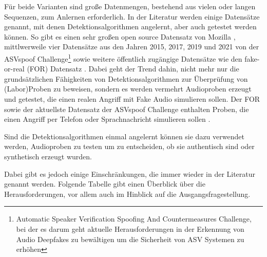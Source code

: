 Für beide Varianten sind große Datenmengen, bestehend aus vielen oder langen Sequenzen, zum Anlernen erforderlich.
In der Literatur werden einige Datensätze genannt, mit denen Detektionsalgorithmen angelernt, aber auch getestet werden können.
So gibt es einen sehr großen open source Datensatz von Mozilla \citep[][]{Ardila2019}, mittlwerweile vier Datensätze aus den Jahren 2015, 2017, 2019 und 2021 von der ASVspoof Challenge\footnote{Automatic Speaker Verification Spoofing And Countermeasures Challenge, bei der es darum geht aktuelle Herausforderungen in der Erkennung von Audio Deepfakes zu bewältigen um die Sicherheit von ASV Systemen zu erhöhen\citep[][]{Yamagishi2021}} sowie weitere öffentlich zugängige Datensätze wie den fake-or-real (FOR) Datensatz \citep[][]{Reimao2019}. 
Dabei geht der Trend dahin, nicht mehr nur die grundsätzlichen Fähigkeiten von Detektionsalgorithmen zur Überprüfung von (Labor)Proben zu beweisen, sondern es werden vermehrt Audioproben erzeugt und getestet, die einen realen Angriff mit Fake Audio simulieren sollen.
Der FOR sowie der aktuellste Datensatz der ASVspoof Challenge enthalten Proben, die einen Angriff per Telefon oder Sprachnachricht simulieren sollen \citep[][]{Masood2022}.

Sind die Detektionsalgorithmen einmal angelernt können sie dazu verwendet werden, Audioproben zu testen um zu entscheiden, ob sie authentisch sind oder synthetisch erzeugt wurden.

Dabei gibt es jedoch einige Einschränkungen, die immer wieder in der Literatur genannt werden.
Folgende Tabelle gibt einen Überblick über die Herausforderungen, vor allem auch im Hinblick auf die Ausgangsfragestellung.
\clearpage

